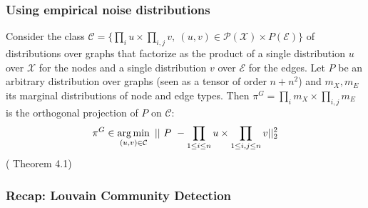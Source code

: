 \documentclass[./presentation.tex]{subfiles}
\begin{document}
\begin{frame}[t,label=digress]
  \frametitle{Using empirical noise distributions}
Consider the class $\mathcal C = \{\prod_i u \times \prod_{i, j} v,~ (u, v) \in \mathcal P(\mathcal{X}) \times P(\mathcal E)\}$ of distributions over graphs that factorize as the product of a single distribution $u$ over $\mathcal X$ for the nodes and a single distribution $v$ over $\mathcal{E}$ for the edges.
Let $P$ be an arbitrary distribution over graphs (seen as a tensor of order $n + n^2$) and $m_X, m_E$ its marginal distributions of node and edge types. Then $\pi^G = \prod_i m_X \times \prod_{i, j} m_E$ is the orthogonal projection of $P$ on $\mathcal{C}$: \vspace{-0.1cm}
\[
\pi^G  \in \operatorname*{arg\,min}_{(u, v) \in \mathcal C}~ ||~P~ -  \prod_{1 \leq i \leq n} u \times \prod_{1 \leq i, j \leq n} v||^2_{2}
\]
(\cite{vignacDiGressDiscreteDenoising2023b} Theorem 4.1)
\end{frame}

\begin{frame}[label=hcgdbackuplouvain]
  \frametitle{Recap: Louvain Community Detection}
\hyperlink{hcgdintro}{}
\end{frame}

\end{document}
